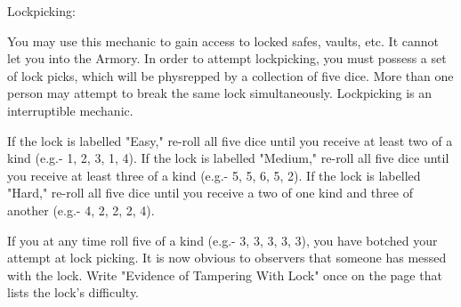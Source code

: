 \documentclass[green]{guildcamp3}
\begin{document}
	
	\name{\gLockpicking{}}
	
	
	
	
	Lockpicking:
	
	You may use this mechanic to gain access to locked safes, vaults, etc. It cannot let you into the Armory.
	In order to attempt lockpicking, you must possess a set of lock picks, which will be physrepped by a collection of five dice. More than one person may attempt to break the same lock simultaneously. Lockpicking is an interruptible mechanic.
	
	
	\begin{enum}[Directions]
		\item If the lock is labelled "Easy," re-roll all five dice until you receive at least two of a kind (e.g.- 1, 2, 3, 1, 4). If the lock is labelled "Medium," re-roll all five dice until you receive at least three of a kind (e.g.- 5, 5, 6, 5, 2). If the lock is labelled "Hard," re-roll all five dice until you receive a two of one kind and three of another (e.g.- 4, 2, 2, 2, 4).
		\item If you at any time roll five of a kind (e.g.- 3, 3, 3, 3, 3), you have botched your attempt at lock picking. It is now obvious to observers that someone has messed with the lock. Write "Evidence of Tampering With Lock" once on the page that lists the lock's difficulty.
		\end{enum}
	
	
\end{document}
